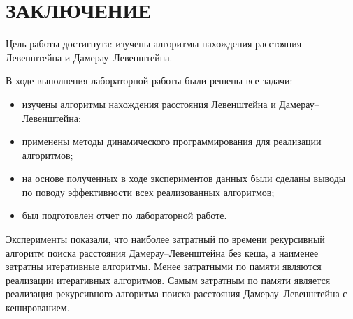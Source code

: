 \section*{ЗАКЛЮЧЕНИЕ}

Цель работы достигнута: изучены алгоритмы нахождения расстояния Левенштейна и Дамерау--Левенштейна.

В ходе выполнения лабораторной работы были решены все задачи:
\begin{itemize}
	\item изучены алгоритмы нахождения расстояния Левенштейна и Дамерау--Левенштейна;
	\item применены методы динамического программирования для реализации алгоритмов;
	\item на основе полученных в ходе экспериментов данных были сделаны выводы по поводу эффективности всех реализованных алгоритмов;
	\item был подготовлен отчет по лабораторной работе.
\end{itemize}

Эксперименты показали, что наиболее затратный по времени рекурсивный алгоритм поиска расстояния Дамерау--Левенштейна без кеша, а наименее затратны итеративные алгоритмы. Менее затратными по памяти являются реализации итеративных алгоритмов. Самым затратным по памяти является реализация рекурсивного алгоритма поиска расстояния Дамерау--Левенштейна с кешированием. 